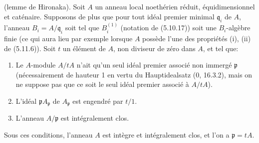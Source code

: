 \begin{proposition}[5.12.8]
\label{IV.2.s5.12.8-fr}
(lemme de Hironaka). Soit $A$ un anneau local noethérien réduit,
équidimensionnel et caténaire. Supposons de plus que pour tout idéal premier
minimal $\mathfrak q_i$ de $A$, l'anneau $B_i=A/\mathfrak q_i$ soit tel que
$B_i^{(1)}$ (notation de (5.10.17)) soit une $B_i$-algèbre finie (ce qui aura
lieu par exemple lorsque $A$ possède l'une des propriétés (i), (ii) de
(5.11.6)). Soit $t$ un élément de $A$, non diviseur de zéro dans $A$, et tel
que:
\begin{enumerate}
\item[(i)] Le $A$-module $A/tA$ n'ait qu'un seul idéal premier associé non
immergé $\mathfrak p$ (nécessairement de hauteur 1 en vertu du
Hauptidealsatz (0, 16.3.2), mais on ne suppose pas que ce soit le seul idéal
premier associé à $A/tA$).
\item[(ii)] L'idéal $\mathfrak pA_{\mathfrak p}$ de $A_{\mathfrak p}$ est
engendré par $t/1$.
\item[(iii)] L'anneau $A/\mathfrak p$ est intégralement clos.
\end{enumerate}
Sous ces conditions, l'anneau $A$ est intègre et intégralement clos, et l'on a
$\mathfrak p=tA$.
\end{proposition}

